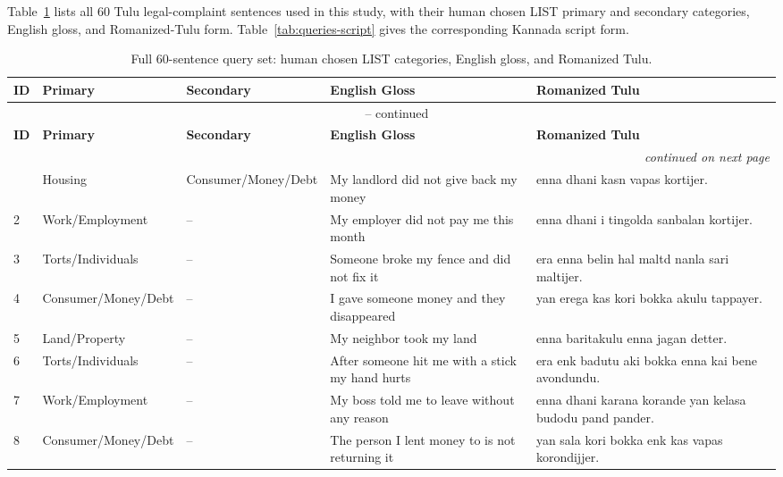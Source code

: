 \documentclass[11pt]{article}
\begin{document}
Table~\ref{tab:queries-main} lists all 60 Tulu legal-complaint sentences
used in this study, with their human chosen LIST primary and secondary
categories, English gloss, and Romanized-Tulu form. Table~\ref{tab:queries-script}
gives the corresponding Kannada script form.

\setlength{\tabcolsep}{3pt}
\begin{longtable}{p{} p{} p{} p{} p{}}
\caption{Full 60-sentence query set: human chosen LIST categories, English gloss, and Romanized Tulu.}
\label{tab:queries-main} \\
\toprule
\textbf{ID} & \textbf{Primary} & \textbf{Secondary} & \textbf{English Gloss} & \textbf{Romanized Tulu} \\
\midrule
\endfirsthead
\multicolumn{5}{c}{\tablename\ \thetable{} -- continued} \\
\toprule
\textbf{ID} & \textbf{Primary} & \textbf{Secondary} & \textbf{English Gloss} & \textbf{Romanized Tulu} \\
\midrule
\endhead
\midrule
\multicolumn{5}{r}{\textit{continued on next page}} \\
\endfoot
\bottomrule
\endlastfoot
1 & Housing & Consumer/\allowbreak Money/\allowbreak Debt & My landlord did not give back my money & enna dhani kasn vapas kortijer. \\
2 & Work/\allowbreak Employment & -- & My employer did not pay me this month & enna dhani i tingolda sanbalan kortijer. \\
3 & Torts/\allowbreak Individuals & -- & Someone broke my fence and did not fix it & era enna belin hal maltd nanla sari maltijer. \\
4 & Consumer/\allowbreak Money/\allowbreak Debt & -- & I gave someone money and they disappeared & yan erega kas kori bokka akulu tappayer. \\
5 & Land/\allowbreak Property & -- & My neighbor took my land & enna baritakulu enna jagan detter. \\
6 & Torts/\allowbreak Individuals & -- & After someone hit me with a stick my hand hurts & era enk badutu aki bokka enna kai bene avondundu. \\
7 & Work/\allowbreak Employment & -- & My boss told me to leave without any reason & enna dhani karana korande yan kelasa budodu pand pander. \\
8 & Consumer/\allowbreak Money/\allowbreak Debt & -- & The person I lent money to is not returning it & yan sala kori bokka enk kas vapas korondijjer. \\

\end{longtable}
\end{document}
